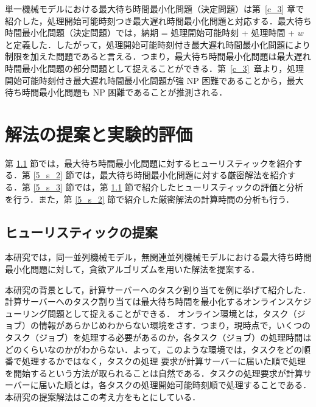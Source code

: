 \documentclass[12pt]{optlab-bachelor}
\begin{document}
単一機械モデルにおける最大待ち時間最小化問題（決定問題）は第~\ref{c_3} 章で紹介した，処理開始可能時刻つき最大遅れ時間最小化問題と対応する．最大待ち時間最小化問題（決定問題）では，納期 = 処理開始可能時刻 + 処理時間 + $w$ と定義した．したがって，処理開始可能時刻付き最大遅れ時間最小化問題により制限を加えた問題であると言える．つまり，最大待ち時間最小化問題は最大遅れ時間最小化問題の部分問題として捉えることができる．第~\ref{c_3}~章より，処理開始可能時刻付き最大遅れ時間最小化問題が強 NP 困難であることから，最大待ち時間最小化問題も NP 困難であることが推測される．

\chapter{解法の提案と実験的評価}\label{c_5}
第 \ref{5_s_1} 節では，最大待ち時間最小化問題に対するヒューリスティックを紹介する．第 \ref{5_s_2} 節では，最大待ち時間最小化問題に対する厳密解法を紹介する．第 \ref{5_s_3} 節では，第 \ref{5_s_1} 節で紹介したヒューリスティックの評価と分析を行う．また，第 \ref{5_s_2} 節で紹介した厳密解法の計算時間の分析も行う．

\section{ヒューリスティックの提案}\label{5_s_1}
本研究では，同一並列機械モデル，無関連並列機械モデルにおける最大待ち時間最小化問題に対して，貪欲アルゴリズムを用いた解法を提案する．

本研究の背景として，計算サーバーへのタスク割り当てを例に挙げて紹介した．
計算サーバーへのタスク割り当ては最大待ち時間を最小化するオンラインスケジューリング問題として捉えることができる．
オンライン環境とは，タスク（ジョブ）の情報があらかじめわからない環境をさす．つまり，現時点で，いくつのタスク（ジョブ）を処理する必要があるのか，各タスク（ジョブ）の処理時間はどのくらいなのかがわからない．よって，このような環境では，タスクをどの順番で処理するかではなく，タスクの処理
要求が計算サーバーに届いた順で処理を開始するという方法が取られることは自然である．タスクの処理要求が計算サーバーに届いた順とは，各タスクの処理開始可能時刻順で処理することである．本研究の提案解法はこの考え方をもとにしている．
\end{document}
